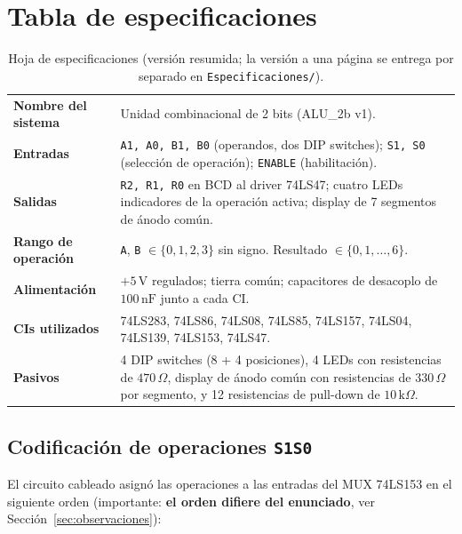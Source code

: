 \documentclass[a4paper,12pt]{article}
\begin{document}
\section{Tabla de especificaciones}

\begin{table}[H]
\centering
\small
\setlength{\tabcolsep}{4pt}
\begin{tabular}{p{3.2cm}p{12.3cm}}
\toprule
\textbf{Nombre del sistema}     & Unidad combinacional de 2 bits (ALU\_2b v1).\\
\textbf{Entradas}               & \texttt{A1, A0, B1, B0} (operandos, dos DIP switches);
                                   \texttt{S1, S0} (selecci\'{o}n de operaci\'{o}n);
                                   \texttt{ENABLE} (habilitaci\'{o}n).\\
\textbf{Salidas}                & \texttt{R2, R1, R0} en BCD al driver 74LS47;
                                   cuatro LEDs indicadores de la operaci\'{o}n activa;
                                   display de 7 segmentos de \'{a}nodo com\'{u}n.\\
\textbf{Rango de operaci\'{o}n}& \texttt{A}, \texttt{B} $\in \{0,1,2,3\}$ sin signo.
                                   Resultado $\in \{0,1,\ldots,6\}$.\\
\textbf{Alimentaci\'{o}n}        & $+5\,\mathrm{V}$ regulados; tierra com\'{u}n;
                                   capacitores de desacoplo de $100\,\mathrm{nF}$
                                   junto a cada CI.\\
\textbf{CIs utilizados}         & 74LS283, 74LS86, 74LS08, 74LS85, 74LS157,
                                   74LS04, 74LS139, 74LS153, 74LS47.\\
\textbf{Pasivos}                & 4 DIP switches (8 + 4 posiciones),
                                   4 LEDs con resistencias de $470\,\Omega$,
                                   display de \'{a}nodo com\'{u}n con resistencias
                                   de $330\,\Omega$ por segmento, y 12
                                   resistencias de pull-down de $10\,\mathrm{k}\Omega$.\\
\bottomrule
\end{tabular}
\caption{Hoja de especificaciones (versi\'{o}n resumida; la versi\'{o}n
a una p\'{a}gina se entrega por separado en
\texttt{Especificaciones/}).}
\label{tab:especificaciones}
\end{table}

\subsection{Codificaci\'{o}n de operaciones \texttt{S1S0}}
El circuito cableado asign\'{o} las operaciones a las entradas del MUX
74LS153 en el siguiente orden (importante: \textbf{el orden difiere del
enunciado}, ver Secci\'{o}n~\ref{sec:observaciones}):
\end{document}
